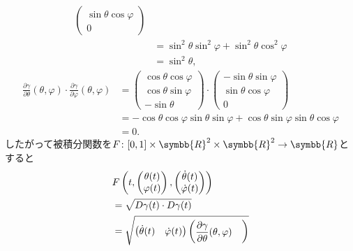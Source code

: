 \documentclass{ltjsbook}
\begin{document}
\begin{specialexample}
\begin{align*}
\begin{pmatrix}
        \sin \theta \cos \varphi \\
        0
    \end{pmatrix} \\
    &= \sin^2 \theta \sin^2 \varphi + \sin^2 \theta \cos^2 \varphi \\
    &= \sin^2 \theta,
\end{align*}
\begin{align*}
    \frac{\partial \gamma}{\partial \theta}(\theta, \varphi)
    \cdot
    \frac{\partial \gamma}{\partial \varphi}(\theta, \varphi)
    &=
    \begin{pmatrix}
        \cos \theta \cos \varphi \\
        \cos \theta \sin \varphi \\
        - \sin \theta
    \end{pmatrix}
    \cdot
    \begin{pmatrix}
        - \sin \theta \sin \varphi \\
        \sin \theta \cos \varphi \\
        0
    \end{pmatrix} \\
    &= - \cos \theta \cos \varphi \sin \theta \sin \varphi
       + \cos \theta \sin \varphi \sin \theta \cos \varphi \\
    &= 0.
\end{align*}
したがって被積分関数を\(F \colon [0, 1] \times \symbb{R}^2 \times \symbb{R}^2 \to \symbb{R}\)とすると
\begin{align*}
    & F\left(
        t,
        \begin{pmatrix}
            \theta(t) \\
            \varphi(t)
        \end{pmatrix},
        \begin{pmatrix}
            \dot{\theta}(t) \\
            \dot{\varphi}(t) \\
        \end{pmatrix}
    \right) \\
    &= \sqrt{D\gamma(t) \cdot D\gamma(t)} \\
    &=
    \sqrt{%
        \begin{pmatrix}
            \dot{\theta}(t) & \dot{\varphi}(t)
        \end{pmatrix}
        \begin{pmatrix}
            \displaystyle
            \frac{\partial \gamma}{\partial \theta}(\theta, \varphi)
            &
            \displaystyle

\end{pmatrix}}
\end{align*}
\end{specialexample}
\end{document}
